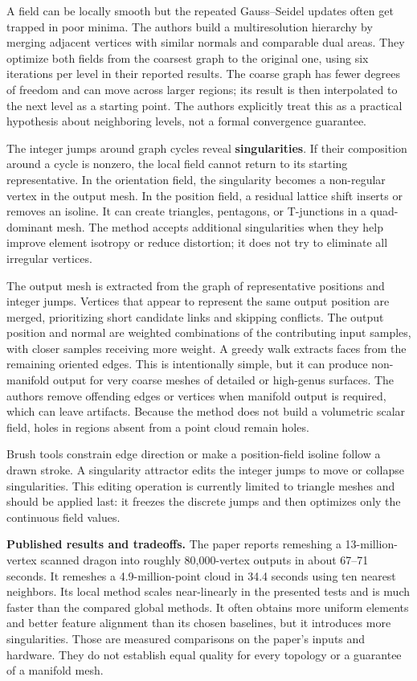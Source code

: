 A field can be locally smooth but the repeated Gauss--Seidel updates often get trapped in poor minima. The authors build a multiresolution hierarchy by merging adjacent vertices with similar normals and comparable dual areas. They optimize both fields from the coarsest graph to the original one, using six iterations per level in their reported results. The coarse graph has fewer degrees of freedom and can move across larger regions; its result is then interpolated to the next level as a starting point. The authors explicitly treat this as a practical hypothesis about neighboring levels, not a formal convergence guarantee.

The integer jumps around graph cycles reveal \textbf{singularities}. If their composition around a cycle is nonzero, the local field cannot return to its starting representative. In the orientation field, the singularity becomes a non-regular vertex in the output mesh. In the position field, a residual lattice shift inserts or removes an isoline. It can create triangles, pentagons, or T-junctions in a quad-dominant mesh. The method accepts additional singularities when they help improve element isotropy or reduce distortion; it does not try to eliminate all irregular vertices.

The output mesh is extracted from the graph of representative positions and integer jumps. Vertices that appear to represent the same output position are merged, prioritizing short candidate links and skipping conflicts. The output position and normal are weighted combinations of the contributing input samples, with closer samples receiving more weight. A greedy walk extracts faces from the remaining oriented edges. This is intentionally simple, but it can produce non-manifold output for very coarse meshes of detailed or high-genus surfaces. The authors remove offending edges or vertices when manifold output is required, which can leave artifacts. Because the method does not build a volumetric scalar field, holes in regions absent from a point cloud remain holes.

Brush tools constrain edge direction or make a position-field isoline follow a drawn stroke. A singularity attractor edits the integer jumps to move or collapse singularities. This editing operation is currently limited to triangle meshes and should be applied last: it freezes the discrete jumps and then optimizes only the continuous field values.

\textbf{Published results and tradeoffs.} The paper reports remeshing a 13-million-vertex scanned dragon into roughly 80,000-vertex outputs in about 67--71 seconds. It remeshes a 4.9-million-point cloud in 34.4 seconds using ten nearest neighbors. Its local method scales near-linearly in the presented tests and is much faster than the compared global methods. It often obtains more uniform elements and better feature alignment than its chosen baselines, but it introduces more singularities. Those are measured comparisons on the paper's inputs and hardware. They do not establish equal quality for every topology or a guarantee of a manifold mesh.

